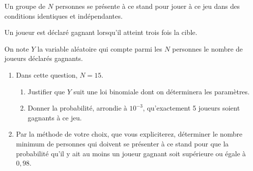 Un groupe de $N$ personnes se présente à ce stand pour jouer à ce jeu dans des conditions identiques et indépendantes. 

Un joueur est déclaré gagnant lorsqu'il atteint trois fois la cible.

On note $Y$ la variable aléatoire qui compte parmi les $N$ personnes le nombre de joueurs déclarés gagnants.

\medskip

\begin{enumerate}
\item Dans cette question, $N = 15$.
	\begin{enumerate}
		\item Justifier que $Y$ suit une loi binomiale dont on déterminera les paramètres.
		\item Donner la probabilité, arrondie à $10^{-3}$, qu'exactement 5 joueurs soient gagnants à ce jeu.
	\end{enumerate}
\item Par la méthode de votre choix, que vous expliciterez, déterminer le nombre minimum de personnes qui doivent se présenter à ce stand pour que la probabilité qu'il y ait au moins un joueur gagnant soit supérieure ou égale à $0,98$.
\end{enumerate}

\bigskip
